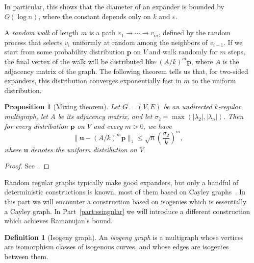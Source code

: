 \documentclass[10pt]{article}
\theoremstyle{plain}
\newtheorem{proposition}[theorem]{Proposition}
\theoremstyle{definition}
\newtheorem{definition}[theorem]{Definition}
\begin{document}
In particular, this shows that the diameter of an expander is bounded
by $O(\log n)$, where the constant depends only on $k$ and $ε$. %

A \emph{random walk} of length $m$ is a path $v_1\to\cdots\to v_m$,
defined by the random process that selects $v_i$ uniformly at random
among the neighbors of $v_{i-1}$. %
If we start from some probability distribution $\mathbf{p}$ on $V$ and
walk randomly for $m$ steps, the final vertex of the walk will be
distributed like $(A/k)^m\mathbf{p}$, where $A$ is the adjacency matrix of
the graph. %
The following theorem tells us that, for two-sided expanders, this
distribution converges exponentially fast in $m$ to the uniform
distribution.

\begin{proposition}[Mixing theorem]
  \label{th:mixing}
  Let $G=(V,E)$ be an undirected $k$-regular multigraph, let $A$ be
  its adjacency matrix, and let $σ₂ = \max(|λ_2|, |λ_n|)$.  %
  Then for every distribution $\mathbf{p}$ on $V$ and every $m>0$, we
  have
  \begin{equation*}
    \| \mathbf{u} - (A/k)^m \mathbf{p} \|_1 ≤ \sqrt{n} \left(\frac{σ_2}{k}\right)^m,
  \end{equation*}
  where $\mathbf{u}$ denotes the uniform distribution on $V$.
\end{proposition}
\begin{proof}
  See~\cite[Chap.~21]{trevisan-graphs}.
\end{proof}

Random regular graphs typically make good expanders, but only a
handful of deterministic constructions is known, most of them based on
Cayley
graphs~\cite{LubPS,chung1989diameters,Goldreich2011,trevisan-graphs}. %
In this part we will encounter a construction based on isogenies which
is essentially a Cayley graph. %
In Part~\ref{part:ssingular} we will introduce a different
construction which achieves Ramanujan's bound.

\begin{definition}[Isogeny graph]
  An \emph{isogeny graph} is a multigraph whose vertices are
  isomorphism classes of isogenous curves, and whose edges are
  isogenies between them.
\end{definition}
\end{document}
